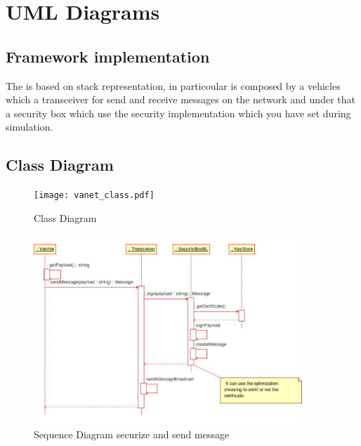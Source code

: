 \section{UML Diagrams}
\subsection{Framework implementation}
The \vs is based on stack representation, in particoular is composed by a vehicles which a transceiver for send and receive messages on the network and under that a security box which use the security implementation which you have set during simulation.
\subsection{Class Diagram}
\begin{figure}[ht]
\centerline{\texttt{[image: vanet\_class.pdf]}}
\caption{Class Diagram}
\label{fig:class_diagram}
\end{figure}
\begin{figure}[ht]
\centerline{\includegraphics[width=0.9\textwidth]{baseline_send_message.pdf}}
\caption{Sequence Diagram \baseline securize and send message}
\label{fig:sequence_send_baseline}
\end{figure}
